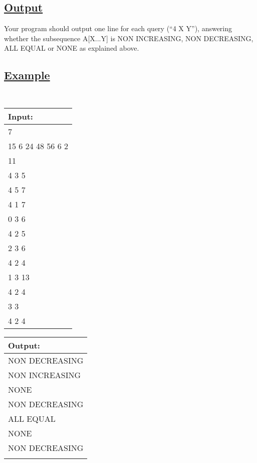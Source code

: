 \documentclass[12pt]{article}
\begin{document}
\subsection*{\underline{Output}}
Your program should output one line for each query (``4 X Y''), answering whether the subsequence A[X...Y] is NON INCREASING, NON DECREASING, ALL EQUAL or NONE as explained above.

\subsection*{\underline{Example}}
\begin{center}\tt
\begin{tabular}{|l|}
\hline
Input: \\
\hline
7\\
15 6 24 48 56 6 2\\
11\\
4 3 5\\
4 5 7\\
4 1 7\\
0 3 6\\
4 2 5\\
2 3 6\\
4 2 4\\
1 3 13\\
4 2 4\\
3 3\\
4 2 4\\
\hline
\end{tabular}\qquad\qquad
\begin{tabular}{|l|}
\hline
Output: \\
\hline
NON DECREASING\\
NON INCREASING\\
NONE\\
NON DECREASING\\
ALL EQUAL\\
NONE\\
NON DECREASING\\
\hline
\multicolumn{1}{c}{}\\[86pt]
\end{tabular}
\end{center}
\end{document}
